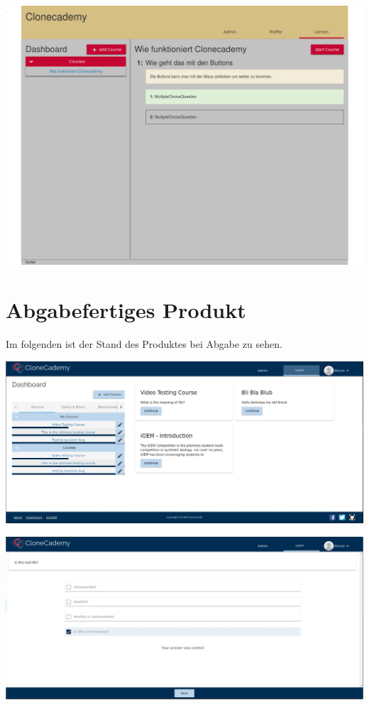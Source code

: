 \documentclass[accentcolor=tud0b,12pt,paper=a4]{tudreport}
\begin{document}
\includegraphics[width=\textwidth]{appendix/screenshots/forntend.png}

\section*{Abgabefertiges Produkt}
Im folgenden ist der Stand des Produktes bei Abgabe zu sehen.

\includegraphics[height=0.3\textheight]{appendix/screenshots/dashboard.jpg}

\includegraphics[height=0.3\textheight]{appendix/screenshots/screenshot-0.jpg}
\end{document}
